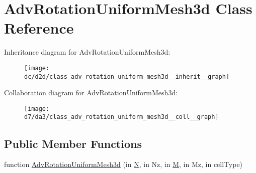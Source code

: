 \hypertarget{class_adv_rotation_uniform_mesh3d}{}\section{Adv\+Rotation\+Uniform\+Mesh3d Class Reference}
\label{class_adv_rotation_uniform_mesh3d}


Inheritance diagram for Adv\+Rotation\+Uniform\+Mesh3d\+:
\nopagebreak
\begin{figure}[H]
\begin{center}
\leavevmode
\texttt{[image: dc/d2d/class\_adv\_rotation\_uniform\_mesh3d\_\_inherit\_\_graph]}
\end{center}
\end{figure}


Collaboration diagram for Adv\+Rotation\+Uniform\+Mesh3d\+:
\nopagebreak
\begin{figure}[H]
\begin{center}
\leavevmode
\texttt{[image: d7/da3/class\_adv\_rotation\_uniform\_mesh3d\_\_coll\_\_graph]}
\end{center}
\end{figure}
\subsection*{Public Member Functions}
\begin{DoxyCompactItemize}
\item 
function \hyperlink{class_adv_rotation_uniform_mesh3d_a847b5d0868c189ea53abdd1dc6246bcf}{Adv\+Rotation\+Uniform\+Mesh3d} (in \hyperlink{class_adv_rotation_uniform_mesh3d_af59bece2b04f2084c05452a1e55cdd51}{N}, in Nz, in \hyperlink{class_adv_rotation_uniform_mesh3d_a6d00f1706f91651bf193d8a7cb60b643}{M}, in Mz, in cell\+Type)
\end{DoxyCompactItemize}
